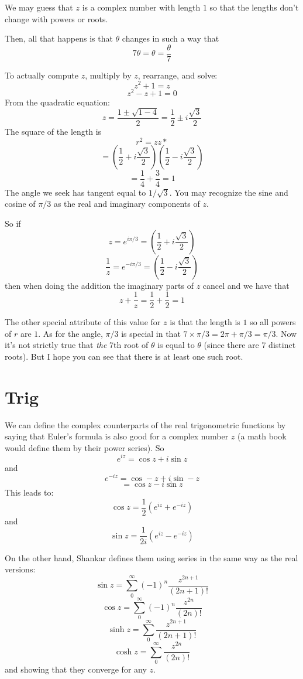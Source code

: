 \documentclass[11pt, oneside]{article}   	%
\begin{document}
We may guess that $z$ is a complex number with length $1$ so that the lengths don't change with powers or roots.  

Then, all that happens is that $\theta$ changes in such a way that 
\[ 7 \theta = \theta = \frac{\theta}{7}  \]

To actually compute $z$, multiply by $z$, rearrange, and solve:
\[ z^2 + 1 = z \]
\[ z^2 - z + 1 = 0 \]
From the quadratic equation:
\[ z = \frac{1 \pm \sqrt{1 - 4}}{2} = \frac{1}{2} \pm i \frac{\sqrt{3}}{2}  \]
The square of the length is
\[ r^2 = zz* \]
\[ = (\frac{1}{2} + i \frac{\sqrt{3}}{2}) (\frac{1}{2} - i \frac{\sqrt{3}}{2})  \]
\[ = \frac{1}{4} + \frac{3}{4} = 1 \]
The angle we seek has tangent equal to $1/\sqrt{3}$.  You may recognize the sine and cosine of $\pi/3$ as the real and imaginary components of $z$.

So if 
\[ z = e^{i \pi/3} = (\frac{1}{2} + i \frac{\sqrt{3}}{2}) \]
\[ \frac{1}{z} = e^{-i \pi/3} = (\frac{1}{2} - i \frac{\sqrt{3}}{2}) \]
then when doing the addition the imaginary parts of $z$ cancel and we have that 
\[ z + \frac{1}{z} = \frac{1}{2} + \frac{1}{2} = 1 \]

The other special attribute of this value for $z$ is that the length is $1$ so all powers of $r$ are $1$.  As for the angle, $\pi/3$ is special in that $7 \times \pi/3 = 2 \pi + \pi/3 = \pi/3$.  Now it's not strictly true that \emph{the} 7th root of $\theta$ is equal to $\theta$ (since there are 7 distinct roots).  But I hope you can see that there is at least one such root.

\section{Trig}

We can define the complex counterparts of the real trigonometric functions by saying that Euler's formula is also good for a complex number $z$ (a math book would define them by their power series).  So
\[ e^{iz} = \cos z + i \sin z \]
and
\[ e^{-iz} = \cos -z + i \sin -z \]
\[ = \cos z - i \sin z \]
This leads to:
\[ \cos z = \frac{1}{2} (e^{iz} + e^{-iz}) \]
and
\[ \sin z = \frac{1}{2i} (e^{iz} - e^{-iz}) \]

On the other hand, Shankar defines them using series in the same way as the real versions:
\[ \sin z = \sum_0^{\infty} (-1)^n \frac{z^{2n+1}}{(2n +1)!} \]
\[ \cos z = \sum_0^{\infty} (-1)^n \frac{z^{2n}}{(2n)!} \]
\[ \sinh z = \sum_0^{\infty} \frac{z^{2n+1}}{(2n +1)!} \]
\[ \cosh z = \sum_0^{\infty} \frac{z^{2n}}{(2n)!} \]
and showing that they converge for any $z$.
\end{document}
